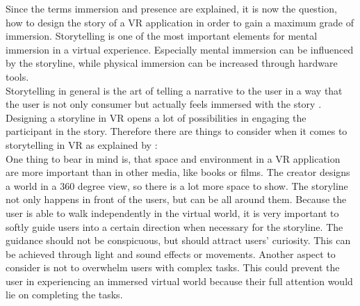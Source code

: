 Since the terms immersion and presence are explained, it is now the question, how to design the story of a VR application in order to gain a maximum grade of immersion. Storytelling is one of the most important elements for mental immersion in a virtual experience. Especially mental immersion can be influenced by the storyline, while physical immersion can be increased through hardware tools. \\
Storytelling in general is the art of telling a narrative to the user in a way that the user is not only consumer but actually feels immersed with the story \cite{Louden.2018}. Designing a storyline in VR opens a lot of possibilities in engaging the participant in the story. Therefore there are things to consider when it comes to storytelling in VR as explained by \cite{Keane.2018}:\\
One thing to bear in mind is, that space and environment in a VR application are more important than in other media, like books or films. The creator designs a world in a 360 degree view, so there is a lot more space to show. The storyline not only happens in front of the users, but can be all around them. Because the user is able to walk independently in the virtual world, it is very important to softly guide users into a certain direction when necessary for the storyline. The guidance should not be conspicuous, but should attract  users' curiosity. This can be achieved through light and sound effects or movements. Another aspect to consider is not to overwhelm  users with complex tasks. This could prevent the user in experiencing an immersed virtual world because their full attention would lie on completing the tasks.

